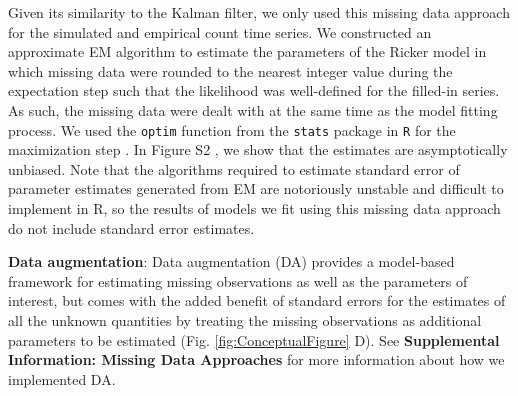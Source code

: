 \documentclass{article}
\begin{document}
Given its similarity to the Kalman filter, we only used this missing data approach for the simulated and empirical count time series. We constructed an approximate EM algorithm to estimate the parameters of the Ricker model in which missing data were rounded to the nearest integer value during the expectation step such that the likelihood was well-defined for the filled-in series. As such, the missing data were dealt with at the same time as the model fitting process. We used the \texttt{optim} function from the \texttt{stats} package in \texttt{R} for the maximization step \citep{r_2021}. In Figure S2%
, we show that the estimates are asymptotically unbiased. Note that the algorithms required to estimate standard error of parameter estimates generated from EM are notoriously unstable and difficult to implement in R, so the results of models we fit using this missing data approach do not include standard error estimates. 


\noindent \textbf{Data augmentation}: Data augmentation (DA) provides a model-based framework for estimating missing observations as well as the parameters of interest, but comes with the added benefit of standard errors for the estimates of all the unknown quantities by treating the missing observations as additional parameters to be estimated (Fig. \ref{fig:ConceptualFigure} D). See \textbf{Supplemental Information: Missing Data Approaches} for more information about how we implemented DA.




\end{document}
